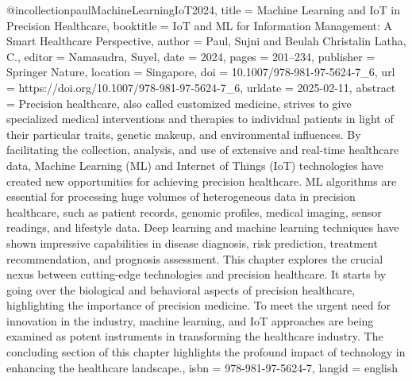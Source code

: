 {{{{@incollection{paulMachineLearningIoT2024,
  title = {Machine {{Learning}} and {{IoT}} in {{Precision Healthcare}}},
  booktitle = {{{IoT}} and {{ML}} for {{Information Management}}: {{A Smart Healthcare Perspective}}},
  author = {Paul, Sujni and Beulah Christalin Latha, C.},
  editor = {Namasudra, Suyel},
  date = {2024},
  pages = {201--234},
  publisher = {Springer Nature},
  location = {Singapore},
  doi = {10.1007/978-981-97-5624-7_6},
  url = {https://doi.org/10.1007/978-981-97-5624-7_6},
  urldate = {2025-02-11},
  abstract = {Precision healthcare, also called customized medicine, strives to give specialized medical interventions and therapies to individual patients in light of their particular traits, genetic makeup, and environmental influences. By facilitating the collection, analysis, and use of extensive and real-time healthcare data, Machine Learning (ML) and Internet of Things (IoT) technologies have created new opportunities for achieving precision healthcare. ML algorithms are essential for processing huge volumes of heterogeneous data in precision healthcare, such as patient records, genomic profiles, medical imaging, sensor readings, and lifestyle data. Deep learning and machine learning techniques have shown impressive capabilities in disease diagnosis, risk prediction, treatment recommendation, and prognosis assessment. This chapter explores the crucial nexus between cutting-edge technologies and precision healthcare. It starts by going over the biological and behavioral aspects of precision healthcare, highlighting the importance of precision medicine. To meet the urgent need for innovation in the industry, machine learning, and IoT approaches are being examined as potent instruments in transforming the healthcare industry. The concluding section of this chapter highlights the profound impact of technology in enhancing the healthcare landscape.},
  isbn = {978-981-97-5624-7},
  langid = {english}
}

}}}}
